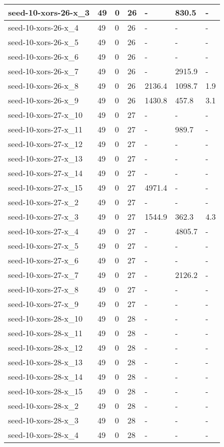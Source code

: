 \begin{scriptsize}
\begin{longtable}{|p{5cm}|l|l|l|l|l|l|}
seed-10-xors-26-x\_3&49&0&26&-&830.5&- \\ \hline 
seed-10-xors-26-x\_4&49&0&26&-&-&- \\ \hline 
seed-10-xors-26-x\_5&49&0&26&-&-&- \\ \hline 
seed-10-xors-26-x\_6&49&0&26&-&-&- \\ \hline 
seed-10-xors-26-x\_7&49&0&26&-&2915.9&- \\ \hline 
seed-10-xors-26-x\_8&49&0&26&2136.4&1098.7&1.9 \\ \hline 
seed-10-xors-26-x\_9&49&0&26&1430.8&457.8&3.1 \\ \hline 
seed-10-xors-27-x\_10&49&0&27&-&-&- \\ \hline 
seed-10-xors-27-x\_11&49&0&27&-&989.7&- \\ \hline 
seed-10-xors-27-x\_12&49&0&27&-&-&- \\ \hline 
seed-10-xors-27-x\_13&49&0&27&-&-&- \\ \hline 
seed-10-xors-27-x\_14&49&0&27&-&-&- \\ \hline 
seed-10-xors-27-x\_15&49&0&27&4971.4&-&- \\ \hline 
seed-10-xors-27-x\_2&49&0&27&-&-&- \\ \hline 
seed-10-xors-27-x\_3&49&0&27&1544.9&362.3&4.3 \\ \hline 
seed-10-xors-27-x\_4&49&0&27&-&4805.7&- \\ \hline 
seed-10-xors-27-x\_5&49&0&27&-&-&- \\ \hline 
seed-10-xors-27-x\_6&49&0&27&-&-&- \\ \hline 
seed-10-xors-27-x\_7&49&0&27&-&2126.2&- \\ \hline 
seed-10-xors-27-x\_8&49&0&27&-&-&- \\ \hline 
seed-10-xors-27-x\_9&49&0&27&-&-&- \\ \hline 
seed-10-xors-28-x\_10&49&0&28&-&-&- \\ \hline 
seed-10-xors-28-x\_11&49&0&28&-&-&- \\ \hline 
seed-10-xors-28-x\_12&49&0&28&-&-&- \\ \hline 
seed-10-xors-28-x\_13&49&0&28&-&-&- \\ \hline 
seed-10-xors-28-x\_14&49&0&28&-&-&- \\ \hline 
seed-10-xors-28-x\_15&49&0&28&-&-&- \\ \hline 
seed-10-xors-28-x\_2&49&0&28&-&-&- \\ \hline 
seed-10-xors-28-x\_3&49&0&28&-&-&- \\ \hline 
seed-10-xors-28-x\_4&49&0&28&-&-&- \\ \hline 

\end{longtable}
\end{scriptsize}
